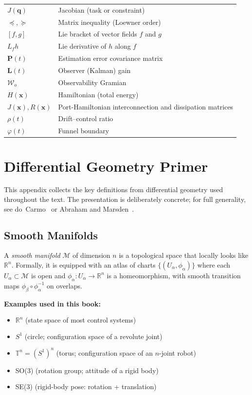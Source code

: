 \documentclass[11pt,letterpaper,openany]{book}
\theoremstyle{plain}
\theoremstyle{definition}
\theoremstyle{remark}
\newcommand{\R}{\mathbb{R}}
\renewcommand{\vec}[1]{\bm{#1}}
\newcommand{\mat}[1]{\mathbf{#1}}
\newcommand{\x}{\vec{x}}
\newcommand{\q}{\vec{q}}
\begin{document}
\begin{center}
\begin{tabular}{lp{10cm}}
$J(\q)$ & Jacobian (task or constraint) \\
$\preceq, \succeq$ & Matrix inequality (Loewner order) \\
$[f, g]$ & Lie bracket of vector fields $f$ and $g$ \\
$L_f h$ & Lie derivative of $h$ along $f$ \\
$\mat{P}(t)$ & Estimation error covariance matrix \\
$\mat{L}(t)$ & Observer (Kalman) gain \\
$\mathcal{W}_o$ & Observability Gramian \\
$H(\x)$ & Hamiltonian (total energy) \\
$J(\x), R(\x)$ & Port-Hamiltonian interconnection and dissipation matrices \\
$\rho(t)$ & Drift--control ratio \\
$\varphi(t)$ & Funnel boundary \\
\bottomrule
\end{tabular}
\end{center}


\appendix

\chapter{Differential Geometry Primer}
\label{app:diffgeo}

This appendix collects the key definitions from differential geometry used throughout the
text. The presentation is deliberately concrete; for full generality, see
do~Carmo~\cite{doCarmo1992} or Abraham and Marsden~\cite{AbrahamMarsden1978}.

\section{Smooth Manifolds}

A \emph{smooth manifold} $\mathcal{M}$ of dimension $n$ is a topological space that locally
looks like $\R^n$. Formally, it is equipped with an atlas of charts $\{(U_\alpha, \phi_\alpha)\}$
where each $U_\alpha \subset \mathcal{M}$ is open and $\phi_\alpha: U_\alpha \to \R^n$ is a
homeomorphism, with smooth transition maps $\phi_\beta \circ \phi_\alpha^{-1}$ on overlaps.

\textbf{Examples used in this book:}
\begin{itemize}
\item $\R^n$ (state space of most control systems)
\item $S^1$ (circle; configuration space of a revolute joint)
\item $\mathbb{T}^n = (S^1)^n$ (torus; configuration space of an $n$-joint robot)
\item SO(3) (rotation group; attitude of a rigid body)
\item SE(3) (rigid-body pose: rotation + translation)
\end{itemize}
\end{document}
